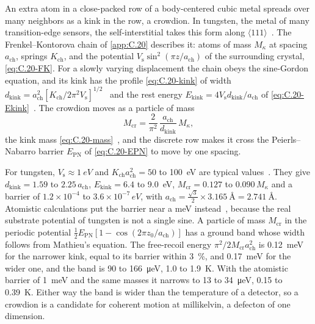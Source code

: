 An extra atom in a close-packed row of a body-centered cubic metal spreads over many neighbors as a kink in the row, a crowdion. In tungsten, the metal of many transition-edge sensors, the self-interstitial takes this form along $\langle111\rangle$~\cite{fitzgerald2018structure}. The Frenkel--Kontorova chain of \cref{app:C.20} describes it: atoms of mass $M_\kappa$ at spacing $a_{\mathrm{ch}}$, springs $K_{\mathrm{ch}}$, and the potential $V_{\mathrm{s}}\sin^2(\pi z/a_{\mathrm{ch}})$ of the surrounding crystal, \cref{eq:C.20-FK}. For a slowly varying displacement the chain obeys the sine-Gordon equation, and its kink has the profile \cref{eq:C.20-kink} of width $d_{\mathrm{kink}} = a_{\mathrm{ch}}^2[K_{\mathrm{ch}}/2\pi^2V_{\mathrm{s}}]^{1/2}$~\cite[Eq.~(2)]{fitzgerald2018structure} and the rest energy $E_{\mathrm{kink}} = 4V_{\mathrm{s}}d_{\mathrm{kink}}/a_{\mathrm{ch}}$ of \cref{eq:C.20-Ekink}~\cite[Eq.~(3)]{fitzgerald2018structure}. The crowdion moves as a particle of mass
\begin{equation}
  M_{\mathrm{cr}} = \frac{2}{\pi^2}\,\frac{a_{\mathrm{ch}}}{d_{\mathrm{kink}}}\,M_\kappa ,
  \label{eq:19.6-Mcr}
\end{equation}
the kink mass \cref{eq:C.20-mass}~\cite{braun2004frenkel}, and the discrete row makes it cross the Peierls--Nabarro barrier $E_{\mathrm{PN}}$ of \cref{eq:C.20-EPN} to move by one spacing.

For tungsten, $V_{\mathrm{s}} \approx \SI{1}{eV}$ and $K_{\mathrm{ch}}a_{\mathrm{ch}}^2 = 50$ to \SI{100}{eV} are typical values~\cite{fitzgerald2018structure}. They give $d_{\mathrm{kink}} = 1.59$ to $2.25\,a_{\mathrm{ch}}$, $E_{\mathrm{kink}} = 6.4$ to \SI{9.0}{eV}, $M_{\mathrm{cr}} = 0.127$ to $0.090\,M_\kappa$ and a barrier of $1.2\times10^{-4}$ to $3.6\times10^{-7}\,\si{eV}$, with $a_{\mathrm{ch}} = \frac{\sqrt3}{2}\times\SI{3.165}{\angstrom} = \SI{2.741}{\angstrom}$. Atomistic calculations put the barrier near a meV instead~\cite{fitzgerald2018structure}, because the real substrate potential of tungsten is not a single sine. A particle of mass $M_{\mathrm{cr}}$ in the periodic potential $\tfrac12E_{\mathrm{PN}}[1 - \cos(2\pi z_0/a_{\mathrm{ch}})]$ has a ground band whose width follows from Mathieu's equation. The free-recoil energy $\pi^2/2M_{\mathrm{cr}}a_{\mathrm{ch}}^2$ is \SI{0.12}{meV} for the narrower kink, equal to its barrier within \SI{3}{\percent}, and \SI{0.17}{meV} for the wider one, and the band is 90 to \SI{166}{\micro eV}, 1.0 to \SI{1.9}{K}. With the atomistic barrier of \SI{1}{meV} and the same masses it narrows to 13 to \SI{34}{\micro eV}, 0.15 to \SI{0.39}{K}. Either way the band is wider than the temperature of a detector, so a crowdion is a candidate for coherent motion at millikelvin, a defecton of one dimension.

